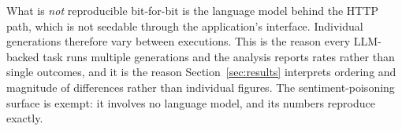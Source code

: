 What is \emph{not} reproducible bit-for-bit is the language model behind
the HTTP path, which is not seedable through the application's
interface. Individual generations therefore vary between executions.
This is the reason every LLM-backed task runs multiple generations and
the analysis reports rates rather than single outcomes, and it is the
reason Section~\ref{sec:results} interprets ordering and magnitude of
differences rather than individual figures. The sentiment-poisoning
surface is exempt: it involves no language model, and its numbers
reproduce exactly.
